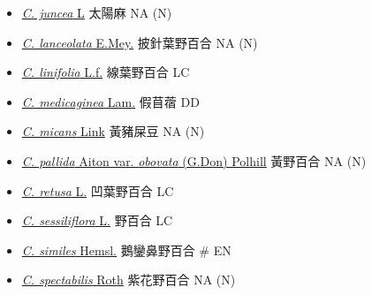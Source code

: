 \begin{itemize}
\begin{itemize}
        \item[] \href{http://www.theplantlist.org/tpl1.1/search?q=Crotalaria+juncea}{\textit{C. juncea} L}   太陽麻   NA (N)
        \item[] \href{http://www.theplantlist.org/tpl1.1/search?q=Crotalaria+lanceolata}{\textit{C. lanceolata} E.Mey.}   披針葉野百合   NA (N)
        \item[] \href{http://www.theplantlist.org/tpl1.1/search?q=Crotalaria+linifolia}{\textit{C. linifolia} L.f.}   線葉野百合   LC
        \item[] \href{http://www.theplantlist.org/tpl1.1/search?q=Crotalaria+medicaginea}{\textit{C. medicaginea} Lam.}   假苜蓿   DD
        \item[] \href{http://www.theplantlist.org/tpl1.1/search?q=Crotalaria+micans}{\textit{C. micans} Link}   黃豬屎豆   NA (N)
        \item[] \href{http://www.theplantlist.org/tpl1.1/search?q=Crotalaria+pallida+var.+obovata}{\textit{C. pallida} Aiton var. \textit{obovata} (G.Don) Polhill}   黃野百合   NA (N)
        \item[] \href{http://www.theplantlist.org/tpl1.1/search?q=Crotalaria+retusa}{\textit{C. retusa} L.}   凹葉野百合   LC
        \item[] \href{http://www.theplantlist.org/tpl1.1/search?q=Crotalaria+sessiliflora}{\textit{C. sessiliflora} L.}   野百合   LC
        \item[] \href{http://www.theplantlist.org/tpl1.1/search?q=Crotalaria+similes}{\textit{C. similes} Hemsl.}   鵝鑾鼻野百合  \# EN
        \item[] \href{http://www.theplantlist.org/tpl1.1/search?q=Crotalaria+spectabilis}{\textit{C. spectabilis} Roth}   紫花野百合   NA (N)

\end{itemize}
\end{itemize}
